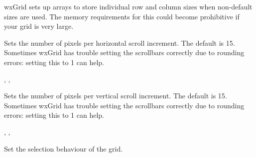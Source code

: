 wxGrid sets up arrays to store individual row and column sizes when non-default sizes are used.
The memory requirements for this could become prohibitive if your grid is very large.



\label{wxgridsetscrolllinex}


Sets the number of pixels per horizontal scroll increment. The default is 15.
Sometimes wxGrid has trouble setting the scrollbars correctly due to rounding
errors: setting this to 1 can help.


,\rtfsp
{},\rtfsp
{}



\label{wxgridsetscrollliney}


Sets the number of pixels per vertical scroll increment. The default is 15.
Sometimes wxGrid has trouble setting the scrollbars correctly due to rounding
errors: setting this to 1 can help.


,\rtfsp
{},\rtfsp
{}



\label{wxgridsetselectionbackground}




\label{wxgridsetselectionforeground}




\label{wxgridsetselectionmode}


Set the selection behaviour of the grid.

